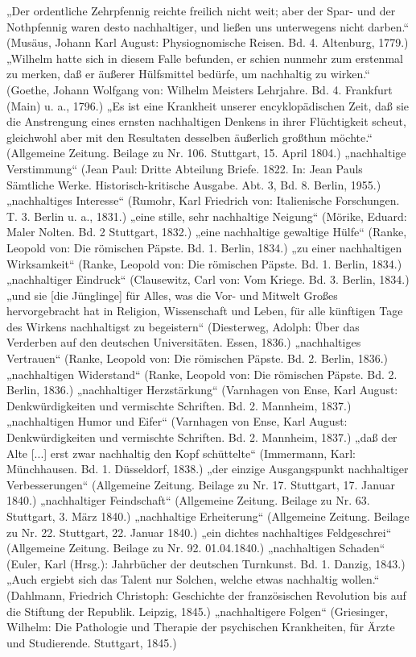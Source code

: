 \documentclass[
    german,
    a4paper,%
    12pt,%
    oneside,%
    toc=bibliography,
    final,
]{scrartcl}
\begin{document}
\begin{exe}
\ex „Der ordentliche Zehrpfennig reichte freilich nicht weit; aber der Spar- und der Nothpfennig waren desto nachhaltiger, und ließen uns unterwegens nicht darben.“ (Musäus, Johann Karl August: Physiognomische Reisen. Bd. 4. Altenburg, 1779.)
\ex „Wilhelm hatte sich in diesem Falle befunden, er schien nunmehr zum erstenmal zu merken, daß er äußerer Hülfsmittel bedürfe, um nachhaltig zu wirken.“ (Goethe, Johann Wolfgang von: Wilhelm Meisters Lehrjahre. Bd. 4. Frankfurt (Main) u. a., 1796.)
\ex „Es ist eine Krankheit unserer encyklopädischen Zeit, daß sie die Anstrengung eines ernsten nachhaltigen Denkens in ihrer Flüchtigkeit scheut, gleichwohl aber mit den Resultaten desselben äußerlich großthun möchte.“ (Allgemeine Zeitung. Beilage zu Nr. 106. Stuttgart, 15. April 1804.)
\ex „nachhaltige Verstimmung“ (Jean Paul: Dritte Abteilung Briefe. 1822. In: Jean Pauls Sämtliche Werke. Historisch-kritische Ausgabe. Abt. 3, Bd. 8. Berlin, 1955.)
\ex „nachhaltiges Interesse“ (Rumohr, Karl Friedrich von: Italienische Forschungen. T. 3. Berlin u. a., 1831.)
\ex „eine stille, sehr nachhaltige Neigung“ (Mörike, Eduard: Maler Nolten. Bd. 2 Stuttgart, 1832.)
\ex „eine nachhaltige gewaltige Hülfe“ (Ranke, Leopold von: Die römischen Päpste. Bd. 1. Berlin, 1834.)
\ex „zu einer nachhaltigen Wirksamkeit“ (Ranke, Leopold von: Die römischen Päpste. Bd. 1. Berlin, 1834.)
\ex „nachhaltiger Eindruck“ (Clausewitz, Carl von: Vom Kriege. Bd. 3. Berlin, 1834.)
\ex „und sie [die Jünglinge] für Alles, was die Vor- und Mitwelt Großes hervorgebracht hat in Religion, Wissenschaft und Leben, für alle künftigen Tage des Wirkens nachhaltigst zu begeistern“ (Diesterweg, Adolph: Über das Verderben auf den deutschen Universitäten. Essen, 1836.)
\ex „nachhaltiges Vertrauen“ (Ranke, Leopold von: Die römischen Päpste. Bd. 2. Berlin, 1836.)
\ex „nachhaltigen Widerstand“ (Ranke, Leopold von: Die römischen Päpste. Bd. 2. Berlin, 1836.)
\ex „nachhaltiger Herzstärkung“ (Varnhagen von Ense, Karl August: Denkwürdigkeiten und vermischte Schriften. Bd. 2. Mannheim, 1837.)
\ex „nachhaltigen Humor und Eifer“ (Varnhagen von Ense, Karl August: Denkwürdigkeiten und vermischte Schriften. Bd. 2. Mannheim, 1837.)
\ex „daß der Alte [...] erst zwar nachhaltig den Kopf schüttelte“ (Immermann, Karl: Münchhausen. Bd. 1. Düsseldorf, 1838.)
\ex „der einzige Ausgangspunkt nachhaltiger Verbesserungen“ (Allgemeine Zeitung. Beilage zu Nr. 17. Stuttgart, 17. Januar 1840.)
\ex „nachhaltiger Feindschaft“ (Allgemeine Zeitung. Beilage zu Nr. 63. Stuttgart, 3. März 1840.)
\ex „nachhaltige Erheiterung“ (Allgemeine Zeitung. Beilage zu Nr. 22. Stuttgart, 22. Januar 1840.)
\ex „ein dichtes nachhaltiges Feldgeschrei“ (Allgemeine Zeitung. Beilage zu Nr. 92. 01.04.1840.)
\ex „nachhaltigen Schaden“ (Euler, Karl (Hrsg.): Jahrbücher der deutschen Turnkunst. Bd. 1. Danzig, 1843.)
\ex „Auch ergiebt sich das Talent nur Solchen, welche etwas nachhaltig wollen.“ (Dahlmann, Friedrich Christoph: Geschichte der französischen Revolution bis auf die Stiftung der Republik. Leipzig, 1845.)
\ex „nachhaltigere Folgen“ (Griesinger, Wilhelm: Die Pathologie und Therapie der psychischen Krankheiten, für Ärzte und Studierende. Stuttgart, 1845.)
\end{exe}
\end{document}
